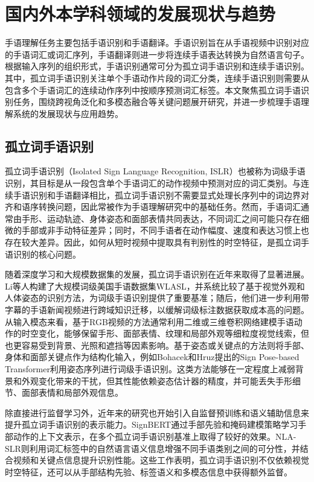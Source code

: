 \chapter{国内外本学科领域的发展现状与趋势}

手语理解任务主要包括手语识别和手语翻译。手语识别旨在从手语视频中识别对应的手语词汇或词汇序列，手语翻译则进一步将连续手语表达转换为自然语言句子。根据输入序列的组织形式，手语识别通常可分为孤立词手语识别和连续手语识别。其中，孤立词手语识别关注单个手语动作片段的词汇分类，连续手语识别则需要从包含多个手语词汇的连续动作序列中按顺序预测词汇标签。本文聚焦孤立词手语识别任务，围绕跨视角泛化和多模态融合等关键问题展开研究，并进一步梳理手语理解系统的发展现状与应用趋势。

\section{孤立词手语识别}

孤立词手语识别（Isolated Sign Language Recognition, ISLR）也被称为词级手语识别，其目标是从一段包含单个手语词汇的动作视频中预测对应的词汇类别。与连续手语识别和手语翻译相比，孤立词手语识别不需要显式处理长序列中的词边界对齐和语序转换问题，因此常被作为手语理解研究中的基础任务。然而，手语词汇通常由手形、运动轨迹、身体姿态和面部表情共同表达，不同词汇之间可能只存在细微的手部或非手动特征差异；同时，不同手语者在动作幅度、速度和表达习惯上也存在较大差异。因此，如何从短时视频中提取具有判别性的时空特征，是孤立词手语识别的核心问题。

随着深度学习和大规模数据集的发展，孤立词手语识别在近年来取得了显著进展。Li等人构建了大规模词级美国手语数据集WLASL，并系统比较了基于视觉外观和人体姿态的识别方法，为词级手语识别提供了重要基准\citep{li2020word}；随后，他们进一步利用带字幕的手语新闻视频进行跨域知识迁移，以缓解词级标注数据获取成本高的问题\citep{li2020transferring}。从输入模态来看，基于RGB视频的方法通常利用二维或三维卷积网络建模手语动作的时空变化，能够保留手形、面部表情、纹理和局部外观等细粒度视觉线索，但也更容易受到背景、光照和遮挡等因素影响。基于姿态或关键点的方法则将手部、身体和面部关键点作为结构化输入，例如Bohacek和Hruz提出的Sign Pose-based Transformer利用姿态序列进行词级手语识别\citep{bohacek2022sign}。这类方法能够在一定程度上减弱背景和外观变化带来的干扰，但其性能依赖姿态估计器的精度，并可能丢失手形细节、面部表情和局部外观信息。

除直接进行监督学习外，近年来的研究也开始引入自监督预训练和语义辅助信息来提升孤立词手语识别的表示能力。SignBERT通过手部先验和掩码建模策略学习手部动作的上下文表示，在多个孤立词手语识别基准上取得了较好的效果\citep{hu2021signbert}。NLA-SLR则利用词汇标签中的自然语言语义信息增强不同手语类别之间的可分性，并结合视频和关键点信息提升识别性能\citep{zuo2023natural}。这些工作表明，孤立词手语识别不仅依赖视觉时空特征，还可以从手部结构先验、标签语义和多模态信息中获得额外监督。


